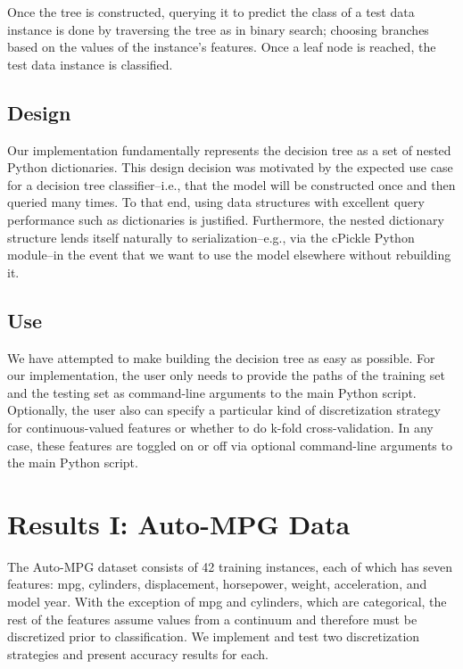 \documentclass[12pt, conference, compsocconf]{IEEEtran}
\begin{document}
Once the tree is constructed, querying it to predict the class of a test data instance is done by traversing the tree as in binary search; choosing branches based on the values of the instance's features. 
Once a leaf node is reached, the test data instance is classified. 

\subsection{Design}
Our implementation fundamentally represents the decision tree as a set of nested Python dictionaries.
This design decision was motivated by the expected use case for a decision tree classifier--i.e., that the model will be constructed once and then queried many times.
To that end, using data structures with excellent query performance such as dictionaries is justified. 
Furthermore, the nested dictionary structure lends itself naturally to serialization--e.g., via the cPickle Python module--in the event that we want to use the model elsewhere without rebuilding it.  

\subsection{Use}
We have attempted to make building the decision tree as easy as possible.
For our implementation, the user only needs to provide the paths of the training set and the testing set as command-line arguments to the main Python script.
Optionally, the user also can specify a particular kind of discretization strategy for continuous-valued features or whether to do k-fold cross-validation. 
In any case, these features are toggled on or off via optional command-line arguments to the main Python script. 

\section{Results I: Auto-MPG Data}
The Auto-MPG dataset consists of 42 training instances, each of which has seven features: mpg, cylinders, displacement, horsepower, weight, acceleration, and model year. 
With the exception of mpg and cylinders, which are categorical, the rest of the features assume values from a continuum and therefore must be discretized prior to classification. 
We implement and test two discretization strategies and present accuracy results for each.
\end{document}
